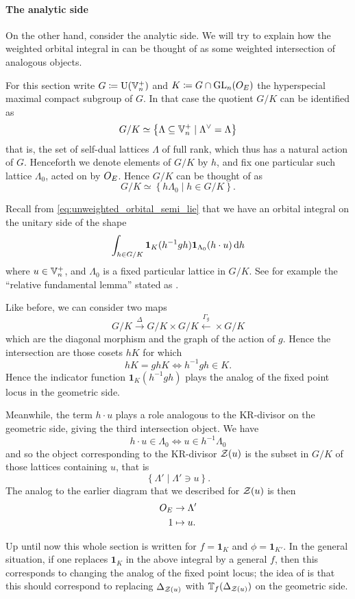 \paragraph{The analytic side}
On the other hand, consider the analytic side.
We will try to explain how the weighted orbital integral in 
can be thought of as some weighted intersection of analogous objects.

For this section write $G \coloneqq \operatorname{U}(\mathbb V_n^+)$ and $K \coloneqq G \cap \operatorname{GL}_n(O_E)$
the hyperspecial maximal compact subgroup of $G$.
In that case the quotient $G/K$ can be identified as
\[ G/K \simeq \left\{ \Lambda \subseteq \mathbb V_n^+ \mid \Lambda^\vee = \Lambda \right\} \]
that is, the set of self-dual lattices $\Lambda$ of full rank,
which thus has a natural action of $G$.
Henceforth we denote elements of $G/K$ by $h$,
and fix one particular such lattice $\Lambda_0$, acted on by $O_E$.
Hence $G/K$ can be thought of as
\[ G/K \simeq \left\{ h \Lambda_0 \mid h \in G/K \right\}. \]

Recall from \eqref{eq:unweighted_orbital_semi_lie}
that we have an orbital integral on the unitary side of the shape
\[ \int_{h \in G/K} \mathbf{1}_K(h^{-1} g h) \mathbf{1}_{\Lambda_0}(h \cdot u) \odif h \]
where $u \in \mathbb V_n^+$, and $\Lambda_0$ is a fixed particular lattice in $G/K$.
See for example the ``relative fundamental lemma''
stated as \cite[Conjecture 1.9]{ref:liuFJ}.

Like before, we can consider two maps
\[ G/K \xrightarrow{\Delta} G/K \times G/K \xleftarrow{\Gamma_g} \times G/K \]
which are the diagonal morphism and the graph of the action of $g$.
Hence the intersection are those cosets $hK$ for which
\[ hK = ghK \iff h^{-1} g h \in K. \]
Hence the indicator function $\mathbf{1}_K(h^{-1} g h)$
plays the analog of the fixed point locus in the geometric side.

Meanwhile, the term $h \cdot u$ plays a role analogous
to the KR-divisor on the geometric side, giving the third intersection object.
We have
\[ h \cdot u \in \Lambda_0 \iff u \in h^{-1} \Lambda_0 \]
and so the object corresponding to the KR-divisor $\mathcal Z(u)$
is the subset in $G/K$ of those lattices containing $u$, that is
\[ \left\{ \Lambda' \mid \Lambda' \ni u \right\}. \]
The analog to the earlier diagram that we described for $\mathcal Z(u)$ is then
\begin{align*}
  O_E &\to \Lambda' \\
  1 &\mapsto u.
\end{align*}

Up until now this whole section is written for $f = \mathbf{1}_K$ and $\phi = \mathbf{1}_{K'}$.
In the general situation,
if one replaces $\mathbf{1}_K$ in the above integral by a general $f$,
then this corresponds to changing the analog of the fixed point locus;
the idea of \cite{ref:AFLspherical} is that
this should correspond to replacing $\Delta_{\mathcal Z(u)}$
with $\mathbb T_f(\Delta_{\mathcal Z(u)})$ on the geometric side.
